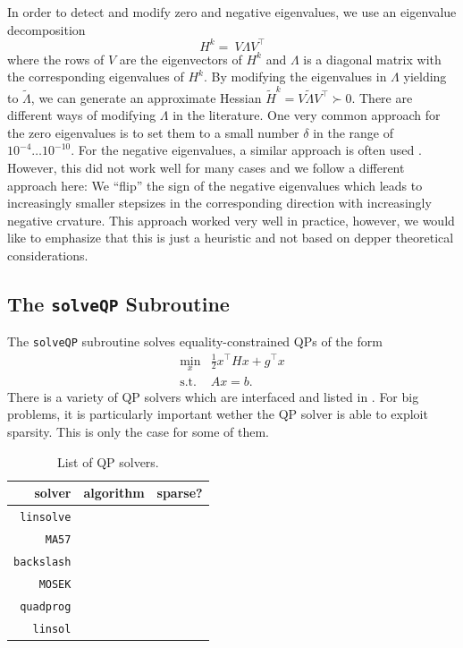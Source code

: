 \documentclass[]{scrartcl}
\begin{document}
In order to detect and modify zero and negative eigenvalues, we use an eigenvalue decomposition
\[
H^k=\ V\Lambda V^\top
\]
where the rows of $V$ are the eigenvectors of $H^k$ and $\Lambda$ is a diagonal matrix with the corresponding eigenvalues of $H^k$.
By modifying the eigenvalues in $\Lambda$ yielding to $\tilde \Lambda$, we can generate an approximate Hessian $\tilde H^k = V \tilde \Lambda V^\top \succ 0$.
There are different ways of modifying $\Lambda$ in the literature.
One very common approach for the zero eigenvalues is to set them to a small number $\delta$ in the range of $10^{-4}\dots 10^{-10}$.
For the negative eigenvalues, a similar approach is often used \cite{Nocedal}.
However, this did not work well for many cases and we follow a different approach here: We ``flip'' the sign of the negative eigenvalues which leads to increasingly smaller stepsizes in the corresponding direction with increasingly negative crvature.
This approach worked very well in practice, however, we would like to emphasize that this is just a heuristic and not based on depper theoretical considerations.

\subsection{The \texttt{solveQP} Subroutine}
The \texttt{solveQP} subroutine solves equality-constrained QPs of the form 
\begin{align*}
\min_x & \frac{1}{2}x^\top Hx + g^\top x \\
\text{s.t.} \;& Ax=b.
\end{align*}
There is a variety of QP solvers which are interfaced and listed in .
For big problems, it is particularly important wether the QP solver is able to exploit sparsity. 
This is only the case for some of them.


\begin{table} 
	\centering
	\begin{tabular}{rcc}
	\hline 
	solver & algorithm & sparse? \\ 
	\hline 
\texttt{linsolve}	&  &  \\ 
	\hline 
\texttt{MA57}	&  &  \\ 
	\hline 
\texttt{backslash}	&  &  \\ 
	\hline 
\texttt{MOSEK}	&  &  \\ 
	\hline 
\texttt{quadprog}	&  &  \\ 
	\hline 
\texttt{linsol}	&  &  \\ 
\hline 
\end{tabular} 
\caption{List of QP solvers.}
 \label{tab:QPsolvers}
\end{table}
\end{document}
